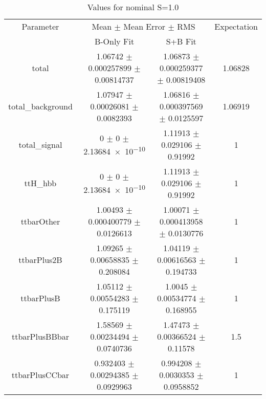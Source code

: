 \begin{table}
\centering
\caption{Values for nominal S=1.0}
\begin{tabular}{cccc}
\toprule
Parameter & \multicolumn{2}{c}{Mean $\pm$ Mean Error $\pm$ RMS} & Expectation\\
 & B-Only Fit & S+B Fit & \\
\midrule
total & \num{1.06742} $\pm$ \num{0.000257899} $\pm$ \num{0.00814737} & \num{1.06873} $\pm$ \num{0.000259377} $\pm$ \num{0.00819408} & \num{1.06828}\\
total\_background & \num{1.07947} $\pm$ \num{0.00026081} $\pm$ \num{0.0082393} & \num{1.06816} $\pm$ \num{0.000397569} $\pm$ \num{0.0125597} & \num{1.06919}\\
total\_signal & \num{0} $\pm$ \num{0} $\pm$ \num{2.13684e-10} & \num{1.11913} $\pm$ \num{0.029106} $\pm$ \num{0.91992} & \num{1}\\
ttH\_hbb & \num{0} $\pm$ \num{0} $\pm$ \num{2.13684e-10} & \num{1.11913} $\pm$ \num{0.029106} $\pm$ \num{0.91992} & \num{1}\\
ttbarOther & \num{1.00493} $\pm$ \num{0.000400779} $\pm$ \num{0.0126613} & \num{1.00071} $\pm$ \num{0.000413958} $\pm$ \num{0.0130776} & \num{1}\\
ttbarPlus2B & \num{1.09265} $\pm$ \num{0.00658835} $\pm$ \num{0.208084} & \num{1.04119} $\pm$ \num{0.00616563} $\pm$ \num{0.194733} & \num{1}\\
ttbarPlusB & \num{1.05112} $\pm$ \num{0.00554283} $\pm$ \num{0.175119} & \num{1.0045} $\pm$ \num{0.00534774} $\pm$ \num{0.168955} & \num{1}\\
ttbarPlusBBbar & \num{1.58569} $\pm$ \num{0.00234494} $\pm$ \num{0.0740736} & \num{1.47473} $\pm$ \num{0.00366524} $\pm$ \num{0.11578} & \num{1.5}\\
ttbarPlusCCbar & \num{0.932403} $\pm$ \num{0.00294385} $\pm$ \num{0.0929963} & \num{0.994208} $\pm$ \num{0.0030353} $\pm$ \num{0.0958852} & \num{1}\\
\bottomrule
\end{tabular}
\end{table}